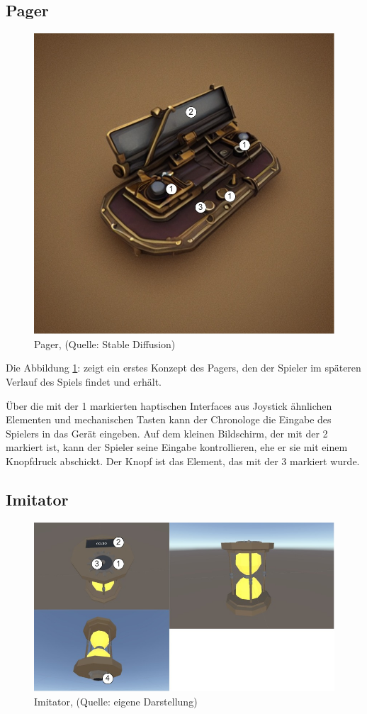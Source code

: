 \subsection{Pager}

\begin{figure}[ht]
\centering
\includegraphics[width=.5\linewidth]{content/pictures/Pager_marks.jpg}
\caption{Pager, (Quelle: Stable Diffusion)}
\label{fig:pager}
\end{figure}

Die Abbildung \ref{fig:pager}:  zeigt ein erstes Konzept des Pagers, den der Spieler im späteren Verlauf des Spiels findet und erhält.

Über die mit der 1 markierten haptischen Interfaces aus Joystick ähnlichen Elementen und mechanischen Tasten kann der Chronologe die Eingabe des Spielers in das Gerät eingeben. Auf dem kleinen Bildschirm, der mit der 2 markiert ist, kann der Spieler seine Eingabe kontrollieren, ehe er sie mit einem Knopfdruck abschickt. Der Knopf ist das Element, das mit der 3 markiert wurde.

\subsection{Imitator}

\begin{figure}[ht]
\centering
\includegraphics[width=1\linewidth]{content/pictures/Imitator.jpg}
\caption{Imitator, (Quelle: eigene Darstellung)}
\label{fig:imitator}
\end{figure}

